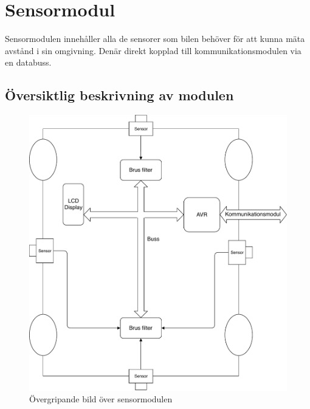 \documentclass[systemskiss/skiss.tex]{subfiles}
\begin{document}
\section{Sensormodul}
Sensormodulen innehåller alla de sensorer som bilen behöver för att kunna mäta avstånd i sin omgivning. Denär direkt kopplad till kommunikationsmodulen via en databuss.
\subsection{Översiktlig beskrivning av modulen}
\begin{figure}[h]
    \centering
    \includegraphics[width=0.6\linewidth]{systemskiss/figures/sensormodul.pdf}
    \caption{Övergripande bild över sensormodulen}
    \label{fig:sensorskiss}
\end{figure}
\end{document}
